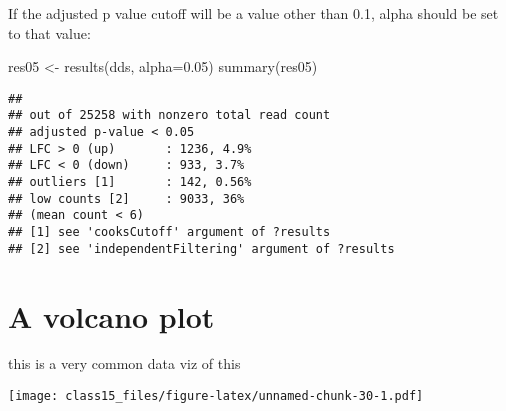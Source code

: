 \documentclass[
]{article}
\newenvironment{Shaded}{\begin{snugshade}}{\end{snugshade}}
\newcommand{\AttributeTok}[1]{\textcolor[rgb]{0.77,0.63,0.00}{#1}}
\newcommand{\CommentTok}[1]{\textcolor[rgb]{0.56,0.35,0.01}{\textit{#1}}}
\newcommand{\DecValTok}[1]{\textcolor[rgb]{0.00,0.00,0.81}{#1}}
\newcommand{\FloatTok}[1]{\textcolor[rgb]{0.00,0.00,0.81}{#1}}
\newcommand{\FunctionTok}[1]{\textcolor[rgb]{0.00,0.00,0.00}{#1}}
\newcommand{\NormalTok}[1]{#1}
\newcommand{\OtherTok}[1]{\textcolor[rgb]{0.56,0.35,0.01}{#1}}
\newcommand{\SpecialCharTok}[1]{\textcolor[rgb]{0.00,0.00,0.00}{#1}}
\newcommand{\StringTok}[1]{\textcolor[rgb]{0.31,0.60,0.02}{#1}}
\begin{document}
If the adjusted p value cutoff will be a value other than 0.1, alpha
should be set to that value:

\begin{Shaded}
\begin{Highlighting}[]
\NormalTok{res05 }\OtherTok{\textless{}{-}} \FunctionTok{results}\NormalTok{(dds, }\AttributeTok{alpha=}\FloatTok{0.05}\NormalTok{)}
\FunctionTok{summary}\NormalTok{(res05)}
\end{Highlighting}
\end{Shaded}

\begin{verbatim}
## 
## out of 25258 with nonzero total read count
## adjusted p-value < 0.05
## LFC > 0 (up)       : 1236, 4.9%
## LFC < 0 (down)     : 933, 3.7%
## outliers [1]       : 142, 0.56%
## low counts [2]     : 9033, 36%
## (mean count < 6)
## [1] see 'cooksCutoff' argument of ?results
## [2] see 'independentFiltering' argument of ?results
\end{verbatim}

\hypertarget{a-volcano-plot}{%
\section{A volcano plot}\label{a-volcano-plot}}

this is a very common data viz of this

\begin{Shaded}
\end{Shaded}

\texttt{[image: class15\_files/figure-latex/unnamed-chunk-30-1.pdf]}

\begin{Shaded}
\end{Shaded}
\end{document}
